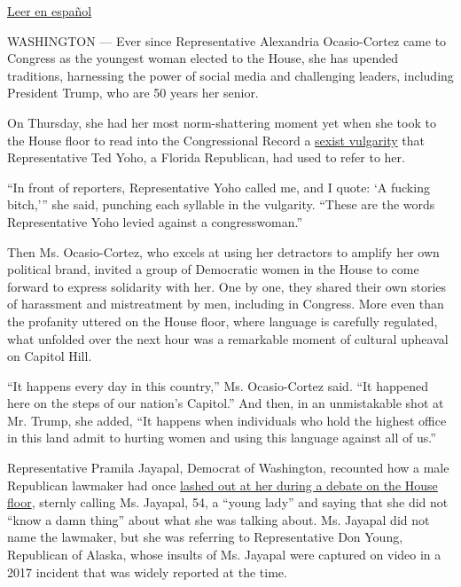 \href{https://www.nytimes.com/es/2020/07/24/espanol/estados-unidos/alexandria-ocasio-cortez-insulto.html}{Leer
en español}

WASHINGTON --- Ever since Representative Alexandria Ocasio-Cortez came
to Congress as the youngest woman elected to the House, she has upended
traditions, harnessing the power of social media and challenging
leaders, including President Trump, who are 50 years her senior.

On Thursday, she had her most norm-shattering moment yet when she took
to the House floor to read into the Congressional Record a
\href{https://www.nytimes.com/2020/07/23/us/politics/aoc-women-ted-yoho.html}{sexist
vulgarity} that Representative Ted Yoho, a Florida Republican, had used
to refer to her.

``In front of reporters, Representative Yoho called me, and I quote: `A
fucking bitch,''' she said, punching each syllable in the vulgarity.
``These are the words Representative Yoho levied against a
congresswoman.''

Then Ms. Ocasio-Cortez, who excels at using her detractors to amplify
her own political brand, invited a group of Democratic women in the
House to come forward to express solidarity with her. One by one, they
shared their own stories of harassment and mistreatment by men,
including in Congress. More even than the profanity uttered on the House
floor, where language is carefully regulated, what unfolded over the
next hour was a remarkable moment of cultural upheaval on Capitol Hill.

``It happens every day in this country,'' Ms. Ocasio-Cortez said. ``It
happened here on the steps of our nation's Capitol.'' And then, in an
unmistakable shot at Mr. Trump, she added, ``It happens when individuals
who hold the highest office in this land admit to hurting women and
using this language against all of us.''

Representative Pramila Jayapal, Democrat of Washington, recounted how a
male Republican lawmaker had once
\href{https://www.facebook.com/seattletimes/videos/rep-pramila-jayapal-called-a-young-lady-by-alaska-congressman/10155535644411215/}{lashed
out at her during a debate on the House floor}, sternly calling Ms.
Jayapal, 54, a ``young lady'' and saying that she did not ``know a damn
thing'' about what she was talking about. Ms. Jayapal did not name the
lawmaker, but she was referring to Representative Don Young, Republican
of Alaska, whose insults of Ms. Jayapal were captured on video in a 2017
incident that was widely reported at the time.

